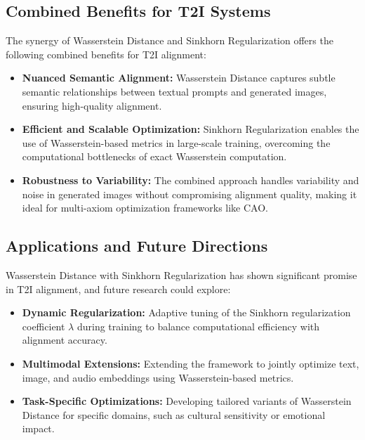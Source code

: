 \subsection{Combined Benefits for T2I Systems}

The synergy of Wasserstein Distance and Sinkhorn Regularization offers the following combined benefits for T2I alignment:

\begin{itemize}
    \item \textbf{Nuanced Semantic Alignment:} Wasserstein Distance captures subtle semantic relationships between textual prompts and generated images, ensuring high-quality alignment.
    \item \textbf{Efficient and Scalable Optimization:} Sinkhorn Regularization enables the use of Wasserstein-based metrics in large-scale training, overcoming the computational bottlenecks of exact Wasserstein computation.
    \item \textbf{Robustness to Variability:} The combined approach handles variability and noise in generated images without compromising alignment quality, making it ideal for multi-axiom optimization frameworks like CAO.
\end{itemize}

\subsection{Applications and Future Directions}

Wasserstein Distance with Sinkhorn Regularization has shown significant promise in T2I alignment, and future research could explore:
\begin{itemize}
    \item \textbf{Dynamic Regularization:} Adaptive tuning of the Sinkhorn regularization coefficient \(\lambda\) during training to balance computational efficiency with alignment accuracy.
    \item \textbf{Multimodal Extensions:} Extending the framework to jointly optimize text, image, and audio embeddings using Wasserstein-based metrics.
    \item \textbf{Task-Specific Optimizations:} Developing tailored variants of Wasserstein Distance for specific domains, such as cultural sensitivity or emotional impact.
\end{itemize}







